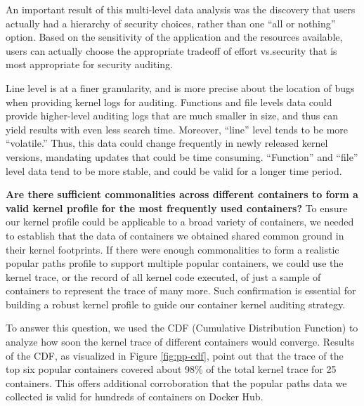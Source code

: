 An important result of this multi-level data analysis was the discovery  that users actually had a hierarchy of security choices, rather than one ``all or nothing'' option. 
Based on the sensitivity of the application and the resources available, users can actually choose the appropriate tradeoff of effort vs.security that is most appropriate for  security auditing. 

Line level is at a finer granularity, and is more precise about the location of bugs when providing kernel logs for auditing. 
Functions and file levels data could provide higher-level auditing logs that are much smaller in size, and thus can yield results with even less search time. 
Moreover, ``line'' level tends to be more ``volatile.'' Thus, this data could change frequently in newly released kernel versions, mandating updates that could be time consuming.  
``Function'' and ``file'' level data tend to be more stable, and could be valid for a longer time period. 

\noindent
\textbf{Are there sufficient commonalities across different containers to form a valid kernel profile for the most frequently used containers?} 
\newline
To ensure our kernel profile could be applicable to a broad variety of containers, we needed to establish that the data of containers we obtained shared common ground in their kernel footprints. 
If there were enough commonalities to form a realistic popular paths profile to support multiple popular containers, we could use the kernel trace, or the record of all kernel code executed, 
of just a sample of containers to represent the trace of many more. Such confirmation is essential for building a robust kernel profile to guide our container kernel auditing strategy.

To answer this question, we used the CDF (Cumulative Distribution Function) to analyze how soon the kernel trace of different containers would converge. 
Results of the CDF, as visualized in Figure \ref{fig:pp-cdf}, point out that the trace of the top six popular containers covered about 98\% of the total kernel trace for 25 containers. 
This offers additional corroboration that the popular paths data we collected is valid for hundreds of containers on Docker Hub.  

